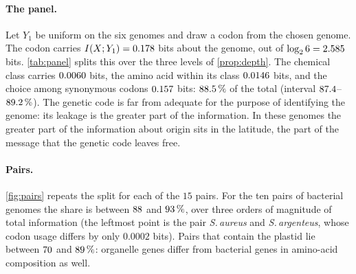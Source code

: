 \paragraph{The panel.} Let $Y_1$ be uniform on the six genomes and draw a codon from the chosen genome. The codon carries $I(X;Y_1)=0.178$ bits about the genome, out of $\log_26=2.585$ bits. \cref{tab:panel} splits this over the three levels of \cref{prop:depth}. The chemical class carries $0.0060$ bits, the amino acid within its class $0.0146$ bits, and the choice among synonymous codons $0.157$ bits: $88.5\,\%$ of the total (interval $87.4$--$89.2\,\%$). The genetic code is far from adequate for the purpose of identifying the genome: its leakage is the greater part of the information. In these genomes the greater part of the information about origin sits in the latitude, the part of the message that the genetic code leaves free.
\begin{table}[tbp]
\caption{Where the information about the genome lives (\cref{prop:depth}). The three terms sum to $I(X;Y_1)$; intervals from resampling genes.}\label{tab:panel}
\centering\small

\end{table}
\paragraph{Pairs.} \cref{fig:pairs} repeats the split for each of the $15$ pairs. For the ten pairs of bacterial genomes the share is between $88$ and $93\,\%$, over three orders of magnitude of total information (the leftmost point is the pair \emph{S.\,aureus} and \emph{S.\,argenteus}, whose codon usage differs by only $0.0002$ bits). Pairs that contain the plastid lie between $70$ and $89\,\%$: organelle genes differ from bacterial genes in amino-acid composition as well.

